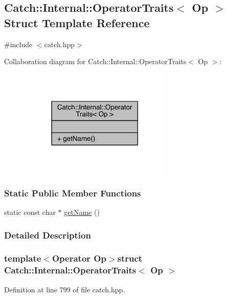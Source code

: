 \hypertarget{a00056}{}\subsection{Catch\+:\+:Internal\+:\+:Operator\+Traits$<$ Op $>$ Struct Template Reference}
\label{a00056}


{\ttfamily \#include $<$catch.\+hpp$>$}



Collaboration diagram for Catch\+:\+:Internal\+:\+:Operator\+Traits$<$ Op $>$\+:\nopagebreak
\begin{figure}[H]
\begin{center}
\leavevmode
\includegraphics[width=206pt]{a00322}
\end{center}
\end{figure}
\subsubsection*{Static Public Member Functions}
\begin{DoxyCompactItemize}
\item 
static const char $\ast$ \hyperlink{a00056_ac6d08082ea33348d42bc4ccbd6d07671}{get\+Name} ()
\end{DoxyCompactItemize}


\subsubsection{Detailed Description}
\subsubsection*{template$<$Operator Op$>$struct Catch\+::\+Internal\+::\+Operator\+Traits$<$ Op $>$}



Definition at line 799 of file catch.\+hpp.




